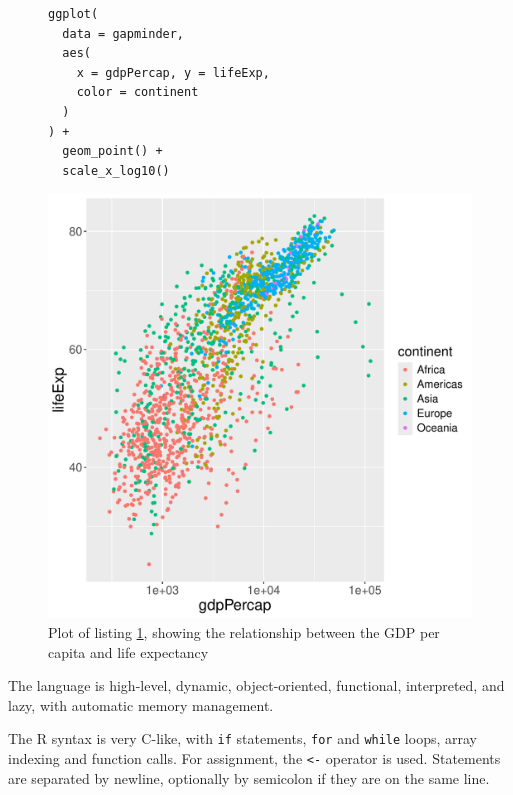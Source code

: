 \begin{figure}[h!]
	\centering
	\begin{minipage}{0.45\textwidth}
		\centering
		\begin{verbatim}
ggplot(
  data = gapminder,
  aes(
    x = gdpPercap, y = lifeExp,
    color = continent
  )
) +
  geom_point() +
  scale_x_log10()
    \end{verbatim}
		\label{lst:motivation}
	\end{minipage}%
	\hfill
	\begin{minipage}{0.45\textwidth}
		\centering
		\includegraphics[width=\textwidth]{figures/motivation-Rplots.pdf}
		\caption{Plot of listing \ref{lst:motivation}, showing the relationship between the GDP per capita and life expectancy}
	\end{minipage}
\end{figure}

The language is high-level, dynamic, object-oriented, functional, interpreted, and lazy, with automatic memory management.

The R syntax is very C-like, with \texttt{if} statements, \texttt{for} and \texttt{while} loops, array indexing and function calls. For assignment, the \texttt{<-} operator is used. Statements are separated by newline, optionally by semicolon if they are on the same line.

